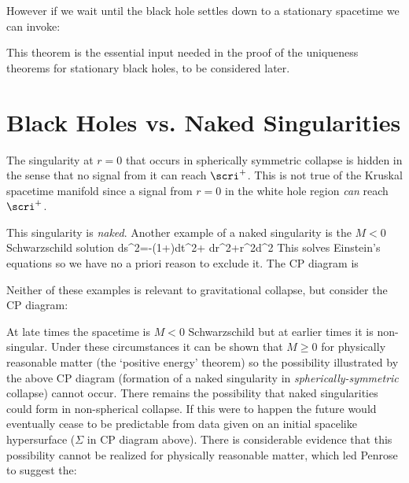 However if we wait until the black hole settles down to a stationary spacetime 
we can invoke: \\


This theorem is the essential input needed in the proof of the uniqueness
theorems for stationary black holes, to be considered later.

\section{Black Holes vs. Naked Singularities}

The singularity at $r=0$ that occurs in spherically symmetric collapse is 
hidden in the sense that no signal from it can reach $\scri^+$.  This is not
true of the Kruskal spacetime manifold since a signal from $r=0$ in the white
hole region \emph{can} reach $\scri^+$.
\begin{center}\end{center}
This singularity is \emph{naked}.  Another example 
of a naked singularity is the $M<0$ Schwarzschild solution
\be
ds^2=-\left(1+\right)dt^2+
dr^2+r^2d\Omega^2
\ee
This solves Einstein's equations so we have no a priori reason to exclude 
it.  The CP diagram is
\begin{center}\end{center}
Neither of these examples is relevant to gravitational collapse, but 
consider the CP diagram:
\begin{center}\end{center}
At late times the spacetime is $M<0$ Schwarzschild but at earlier times 
it is non-singular.  Under these circumstances it can be shown that $M\ge 0$ for
physically reasonable matter (the `positive energy' theorem) so the possibility
illustrated by the above CP diagram (formation of a naked singularity in
\emph{spherically-symmetric} collapse) cannot occur.  There remains the
possibility that naked singularities could form in non-spherical collapse.  If
this were to happen the future would eventually cease to be predictable from
data given on an initial spacelike hypersurface ($\Sigma$ in CP diagram above). 
There is considerable evidence that this possibility cannot be realized for
physically reasonable matter, which led Penrose to suggest the:

